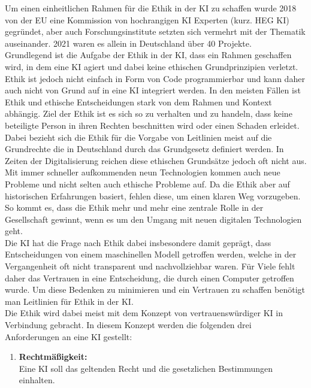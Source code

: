 \begin{onehalfspace}
        Um einen einheitlichen Rahmen für die Ethik in der \ac*{KI} zu schaffen wurde 2018 von der EU eine Kommission von hochrangigen \ac*{KI} Experten (kurz. HEG KI) gegründet, aber auch Forschungsinstitute setzten sich vermehrt mit der Thematik auseinander. 2021 waren es allein in Deutschland über 40 Projekte.\cite{Beckert2021}
        \\
        Grundlegend ist die Aufgabe der Ethik in der \ac*{KI}, dass ein Rahmen geschaffen wird, in dem eine \ac*{KI} agiert und dabei keine ethischen Grundprinzipien verletzt.\cite{Cremers2019} Ethik ist jedoch nicht einfach in Form von Code programmierbar und kann daher auch nicht von Grund auf in eine \ac*{KI} integriert werden. In den meisten Fällen ist Ethik und ethische Entscheidungen stark von dem Rahmen und Kontext abhängig. Ziel der Ethik ist es sich so zu verhalten und zu handeln, dass  keine beteiligte Person in ihren Rechten beschnitten wird oder einen Schaden erleidet.\cite{Heesen2020}
        Dabei bezieht sich die Ethik für die Vorgabe von Leitlinien meist auf die Grundrechte die in Deutschland durch das Grundgesetz definiert werden. In Zeiten der Digitalisierung reichen diese ethischen Grundsätze jedoch oft nicht aus. Mit immer schneller aufkommenden neun Technologien kommen auch neue Probleme und nicht selten auch ethische Probleme auf. Da die Ethik aber auf historischen Erfahrungen basiert, fehlen diese, um einen klaren Weg vorzugeben. So kommt es, dass die Ethik mehr und mehr eine zentrale Rolle in der Gesellschaft gewinnt, wenn es um den Umgang mit neuen digitalen Technologien geht.\cite{Cremers2019} \\
        Die \ac*{KI} hat die Frage nach Ethik dabei insbesondere damit geprägt, dass Entscheidungen von einem maschinellen Modell getroffen werden, welche in der Vergangenheit oft nicht transparent und nachvollziehbar waren. Für Viele fehlt daher das Vertrauen in eine Entscheidung, die durch einen Computer getroffen wurde. Um diese Bedenken zu minimieren und ein Vertrauen zu schaffen benötigt man Leitlinien für Ethik in der \ac*{KI}.\cite{Heesen2020}
        \\
        Die Ethik wird dabei meist mit dem Konzept von vertrauenswürdiger \ac*{KI} in Verbindung gebracht. In diesem Konzept werden die folgenden drei Anforderungen an eine \ac*{KI} gestellt:
        \begin{enumerate}
            \item \textbf{Rechtmäßigkeit:} \\ Eine \ac*{KI} soll das geltenden Recht und die gesetzlichen Bestimmungen einhalten.

\end{enumerate}
\end{onehalfspace}
